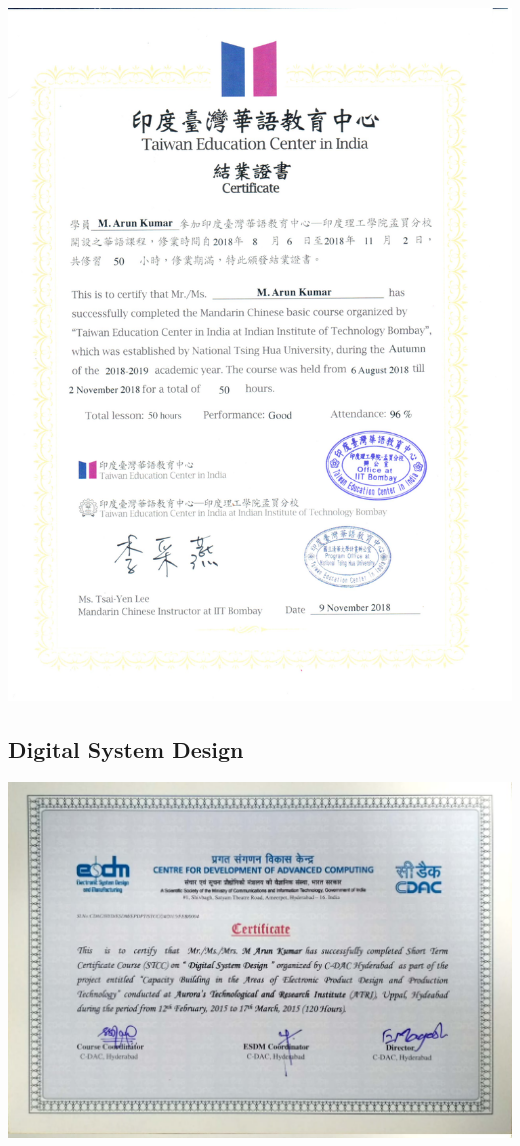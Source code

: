 \documentclass{article}
\begin{document}
		\includegraphics[page=1, scale=0.5]{proofs/chinese_1.pdf}\\
	\subsection{Digital System Design}
		\includegraphics[page=1, scale=0.25]{proofs/cdac.jpeg}
\end{document}
